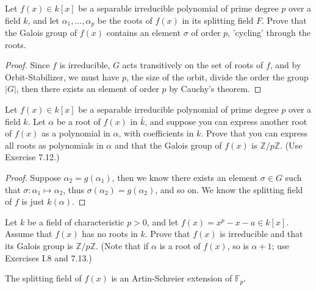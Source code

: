 \documentclass[openany]{book}
\begin{document}




\begin{prob}
Let \( f(x) \in k[x] \) be a separable irreducible polynomial of prime degree \( p \) over a field \( k \), and let \( \alpha_1, \ldots, \alpha_p \) be the roots of \( f(x) \) in its splitting field \( F \). Prove that the Galois group of \( f(x) \) contains an element \( \sigma \) of order \( p \), 'cycling' through the roots.
\end{prob}
\begin{proof}
    Since $f$ is irreducible, $G$ acts transitively on the set of roots of $f$, and by Orbit-Stabilizer, we must have $p$, the size of the orbit, divide the order the group $|G|$, then there exists an element of order $p$ by Cauchy's theorem.
\end{proof}







\begin{prob}
Let \( f(x) \in k[x] \) be a separable irreducible polynomial of prime degree \( p \) over a field \( k \). Let \( \alpha \) be a root of \( f(x) \) in \( \bar{k} \), and suppose you can express another root of \( f(x) \) as a polynomial in \( \alpha \), with coefficients in \( k \). Prove that you can express all roots as polynomials in \( \alpha \) and that the Galois group of \( f(x) \) is \( \mathbb{Z}/p\mathbb{Z} \). (Use Exercise 7.12.)
\end{prob}
\begin{proof}
    Suppose $\alpha_2=g(\alpha_1)$, then we know there exists an element $\sigma\in G$ such that $\sigma:\alpha_1\mapsto\alpha_2$, thus $\sigma(\alpha_2)=g(\alpha_2)$, and so on. We know the splitting field of $f$ is just $k(\alpha)$.
\end{proof}






\begin{prob}
Let \( k \) be a field of characteristic \( p > 0 \), and let \( f(x) = x^p - x - a \in k[x] \). Assume that \( f(x) \) has no roots in \( k \). Prove that \( f(x) \) is irreducible and that its Galois group is \( \mathbb{Z}/p\mathbb{Z} \). (Note that if \( \alpha \) is a root of \( f(x) \), so is \( \alpha + 1 \); use Exercises I.8 and 7.13.)

The splitting field of \( f(x) \) is an Artin-Schreier extension of \( \mathbb{F}_p \).
\end{prob}
\end{document}
